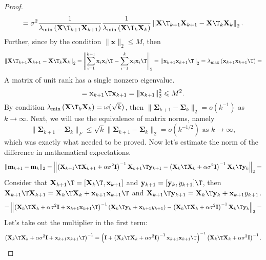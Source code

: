 \documentclass[sn-mathphys-num]{sn-jnl}%
\begin{document}
\begin{appendices}
\begin{proof}
    \[ = \sigma^2  \dfrac{1}{\lambda_{\min}\left( \mathbf{X}\T_{k+1} \mathbf{X}_{k+1} \right)} \dfrac{1}{\lambda_{\min}\left( \mathbf{X}\T_k \mathbf{X}_k \right)} \left\| \mathbf{X}\T_{k+1} \mathbf{X}_{k+1} - \mathbf{X}\T_k \mathbf{X}_k \right\|_2. \]
Further, since by the condition $\|\mathbf{x}\|_2 \leqslant M$, then
    \[ \left\| \mathbf{X}\T_{k+1} \mathbf{X}_{k+1} - \mathbf{X}\T_k \mathbf{X}_k \right\|_2 = \left\| \sum\limits_{i=1}^{k+1} \mathbf{x}_i \mathbf{x}_i\T - \sum\limits_{i=1}^{k} \mathbf{x}_i \mathbf{x}_i\T \right\|_2 = \left\| \mathbf{x}_{k+1} \mathbf{x}_{k+1}\T \right\|_2 = \lambda_{\max}\left( \mathbf{x}_{k+1} \mathbf{x}_{k+1}\T \right) = \]
    A matrix of unit rank has a single nonzero eigenvalue.
    \[= \mathbf{x}_{k+1}\T \mathbf{x}_{k+1} = \| \mathbf{x}_{k+1}\|_2^2 \leqslant M^2. \]
By condition $\lambda_{\min}\left(\mathbf{X}\T_k\mathbf{X}_k \right) = \omega(\sqrt{k})$, then $\|\mathbf{\Sigma}_{k+1} - \mathbf{\Sigma}_k\|_2 = o(k^{-1})$ as $k\to \infty$. Next, we will use the equivalence of matrix norms, namely
    \[ \|\mathbf{\Sigma}_{k+1} - \mathbf{\Sigma}_k \|_F \leqslant\sqrt{k}\|\mathbf{\Sigma}_{k+1} - \mathbf{\Sigma}_k\|_2 = o(k^{-1/2}) \text{ as } k\to \infty, \]
    which was exactly what needed to be proved. Now let's estimate the norm of the difference in mathematical expectations.
    \[ \| \mathbf{m}_{k+1} - \mathbf{m}_k \|_2 = \left\| \left( \mathbf{X}_{k+1}\T \mathbf{X}_{k+1} + \alpha \sigma^2 \mathbf{I} \right)^{-1} \mathbf{X}_{k+1}\T \mathbf{y}_{k+1} - \left( \mathbf{X}_k\T \mathbf{X}_k + \alpha \sigma^2 \mathbf{I} \right)^{-1} \mathbf{X}_k\T \mathbf{y}_k \right\|_2 = \]
    Consider that $\mathbf{X}_{k+1}\T = [\mathbf{X}_k\T,\mathbf{x}_{k+1}]$ and $\mathbf{y}_{k+1} = [\mathbf{y}_k, y_{k+1}]\T$, then $\mathbf{X}_{k+1}\T\mathbf{X}_{k+1} = \mathbf{X}_k\T \mathbf{X}_k +\mathbf{x}_{k+1} \mathbf{x}_{k+1}\T$ and $\mathbf{X}_{k+1}\T\mathbf{y}_{k+1} = \mathbf{X}_k\T \mathbf{y}_k + \mathbf{x}_{k+1} y_{k+1}$.
    \[ = \left\| \left( \mathbf{X}_k\T \mathbf{X}_k + \alpha \sigma^2 \mathbf{I} + \mathbf{x}_{k+1} \mathbf{x}_{k+1}\T \right)^{-1} \left( \mathbf{X}_k\T \mathbf{y}_k + \mathbf{x}_{k+1} y_{k+1} \right) - \left( \mathbf{X}_k\T \mathbf{X}_k + \alpha \sigma^2 \mathbf{I} \right)^{-1} \mathbf{X}_k\T \mathbf{y}_k \right\|_2 = \]
    Let's take out the multiplier in the first term:
\[\left(\mathbf{X}_k\T \mathbf{X}_k+ \alpha\sigma^2 \mathbf{I} +\mathbf{x}_{k+1}\mathbf{x}_{k+1}\T\right)^{-1}= \left(\mathbf{I} + \left( \mathbf{X}_k\T\mathbf{X}_k +\alpha \sigma^2 \mathbf{I}\right)^{-1}\mathbf{x}_{k+1}\mathbf{x}_{k+1}\T\right)^{-1} \left(\mathbf{X}_k\T \mathbf{X}_k + \alpha \sigma^2 \mathbf{I}\right)^{-1}.\]

\end{proof}
\end{appendices}
\end{document}
